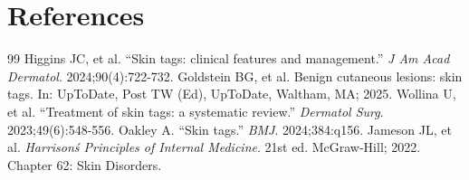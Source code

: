 \section*{References}
\begin{thebibliography}{99}
 Higgins JC, et al. ``Skin tags: clinical features and management.'' \emph{J Am Acad Dermatol}. 2024;90(4):722-732.
 Goldstein BG, et al. Benign cutaneous lesions: skin tags. In: UpToDate, Post TW (Ed), UpToDate, Waltham, MA; 2025.
 Wollina U, et al. ``Treatment of skin tags: a systematic review.'' \emph{Dermatol Surg}. 2023;49(6):548-556.
 Oakley A. ``Skin tags.'' \emph{BMJ}. 2024;384:q156.
 Jameson JL, et al. \emph{Harrison\'s Principles of Internal Medicine}. 21st ed. McGraw-Hill; 2022. Chapter 62: Skin Disorders.
\end{thebibliography}
